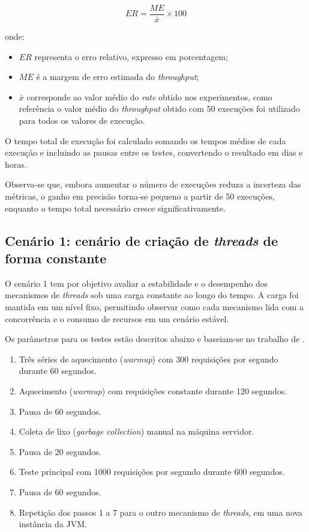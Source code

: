 \documentclass[12pt, openright, oneside, a4paper, english,	french,	spanish, brazil	]{abntex2}
\begin{document}
    \begin{equation}
    \label{eq:erro_relativo}
    ER = \frac{ME}{\bar{x}} \times 100
    \end{equation}

    onde:
    \begin{itemize}
        \item $ER$ representa o erro relativo, expresso em porcentagem;
        \item $ME$ é a margem de erro estimada do \textit{throughput};
        \item $\bar{x}$ corresponde ao valor médio do \textit{rate} obtido nos experimentos, como referência o valor médio do \textit{throughput} obtido com 50 execuções foi utilizado para todos os valores de execução. 
    \end{itemize}
    
    O tempo total de execução foi calculado somando os tempos médios de cada execução e incluindo as pausas entre os testes, convertendo o resultado em dias e horas.

    Observa-se que, embora aumentar o número de execuções reduza a incerteza das métricas, o ganho em precisão torna-se pequeno a partir de 50 execuções, enquanto o tempo total necessário cresce significativamente.

    \subsection {Cenário 1: cenário de criação de \textit{threads} de forma constante}

    O cenário 1 tem por objetivo avaliar a estabilidade e o desempenho dos mecanismos de \textit{threads} sob uma carga constante ao longo do tempo. A carga foi mantida em um nível fixo, permitindo observar como cada mecanismo lida com a concorrência e o consumo de recursos em um cenário estável.

    Os parâmetros para os testes estão descritos abaixo e baseiam-se no trabalho de .

    \begin{enumerate}
        \item Três séries de aquecimento (\textit{warmup}) com 300 requisições por segundo durante 60 segundos.
        \item Aquecimento (\textit{warmup}) com requisições constante durante 120 segundos.
        \item Pausa de 60 segundos.
        \item Coleta de lixo (\textit{garbage collection}) manual na máquina servidor.
        \item Pausa de 20 segundos.
        \item Teste principal com 1000 requisições por segundo durante 600 segundos.
        \item Pausa de 60 segundos.
        \item Repetição dos passos 1 a 7 para o outro mecanismo de \textit{threads}, em uma nova instância da JVM.
    \end{enumerate}
\end{document}
